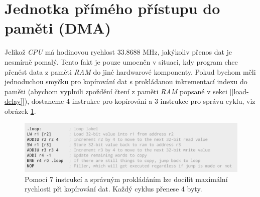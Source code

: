 \section{Jednotka přímého přístupu do paměti (DMA)}

Jelikož \textit{CPU} má hodinovou rychlost 33.8688 MHz, jakýkoliv přenos dat je nesmírně pomalý. 
Tento fakt je pouze umocněn v situaci, kdy program chce přenést data z paměti \textit{RAM} do jiné hardwarové komponenty. 
Pokud bychom měli jednoduchou smyčku pro kopírování dat s prokládanou inkrementací indexu do paměti (abychom vyplnili zpoždění čtení z paměti \textit{RAM} popsané v sekci [\ref{load-delay}]),
dostaneme 4 instrukce pro kopírování a 3 instrukce pro správu cyklu, viz obrázek \ref{slow-copy}.

\begin{figure}[hbt]
	\centering
	\includegraphics[width=1.0\textwidth]{obrazky-figures/slow-copy.png}
	\caption[\textit{CPU} program pro přesouvání dat bez \textit{DMA}]{Pomocí 7 instrukcí a správným prokládáním lze docílit maximální rychlosti při kopírování dat. Každý cyklus přenese 4 byty.}
	\label{slow-copy}
\end{figure}

